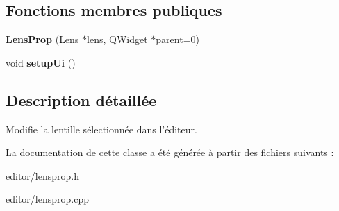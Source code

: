 \subsection*{Fonctions membres publiques}
\begin{DoxyCompactItemize}
\item 
\hypertarget{classLensProp_a2a9f54d768d72f8ad69e1572259d2a85}{{\bfseries Lens\+Prop} (\hyperlink{classLens}{Lens} $\ast$lens, Q\+Widget $\ast$parent=0)}\label{classLensProp_a2a9f54d768d72f8ad69e1572259d2a85}

\item 
\hypertarget{classLensProp_a4b21de75fded3126b60dd75e17811e97}{void {\bfseries setup\+Ui} ()}\label{classLensProp_a4b21de75fded3126b60dd75e17811e97}

\end{DoxyCompactItemize}


\subsection{Description détaillée}
Modifie la lentille sélectionnée dans l’éditeur. 

La documentation de cette classe a été générée à partir des fichiers suivants \+:\begin{DoxyCompactItemize}
\item 
editor/lensprop.\+h\item 
editor/lensprop.\+cpp\end{DoxyCompactItemize}
